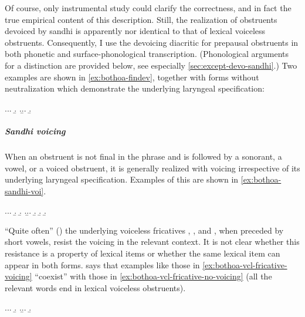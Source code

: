Of course, only instrumental study could clarify the correctness, and in fact the true empirical content of this description. Still, the realization of obstruents devoiced by sandhi is apparently nor identical to that of lexical voiceless obstruents. Consequently, I use the devoicing diacritic for prepausal obstruents in both phonetic and surface\hyp phonological transcription. (Phonological arguments for a distinction are provided below, see especially \cref{sec:except-devo-sandhi}.) Two examples are shown in \ref{ex:bothoa-findev}, together with forms without neutralization which demonstrate the underlying laryngeal specification:

\ex.\label{ex:bothoa-findev}\a.\a.
\b.
\z.\b.\a.
\b.

\subparagraph{Sandhi voicing}
\label{sec:sandhi-voicing-phon}

When an obstruent is not final in the phrase and is followed by a sonorant, a vowel, or a voiced obstruent, it is generally realized with voicing irrespective of its underlying laryngeal specification. Examples of this are shown in \cref{ex:bothoa-sandhi-voi}.

\ex.\label{ex:bothoa-sandhi-voi}\a.\a.
\b.
\b.
\z.\b.\a.
\b.
\b.
\b.

\enquote{Quite often} () the underlying voiceless fricatives , , and , when preceded by short vowels, resist the voicing in the relevant context. It is not clear whether this resistance is a property of lexical items or whether the same lexical item can appear in both forms. \citet{humphreys95:_phonol_bothoa_saint_nicol_pelem} says that examples like those in \cref{ex:bothoa-vcl-fricative-voicing} \enquote{coexist} with those in \cref{ex:bothoa-vcl-fricative-no-voicing} (all the relevant words end in lexical voiceless obstruents).

\ex.\a.\label{ex:bothoa-vcl-fricative-voicing}\a.
\b.
\z.\b.\label{ex:bothoa-vcl-fricative-no-voicing}\a.
\b.

